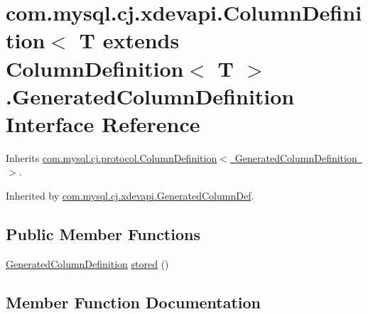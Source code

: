 \hypertarget{interfacecom_1_1mysql_1_1cj_1_1xdevapi_1_1_column_definition_1_1_generated_column_definition}{}\section{com.\+mysql.\+cj.\+xdevapi.\+Column\+Definition$<$ T extends Column\+Definition$<$ T $>$.Generated\+Column\+Definition Interface Reference}
\label{interfacecom_1_1mysql_1_1cj_1_1xdevapi_1_1_column_definition_1_1_generated_column_definition}


Inherits \mbox{\hyperlink{interfacecom_1_1mysql_1_1cj_1_1protocol_1_1_column_definition}{com.\+mysql.\+cj.\+protocol.\+Column\+Definition$<$ Generated\+Column\+Definition $>$}}.



Inherited by \mbox{\hyperlink{classcom_1_1mysql_1_1cj_1_1xdevapi_1_1_generated_column_def}{com.\+mysql.\+cj.\+xdevapi.\+Generated\+Column\+Def}}.

\subsection*{Public Member Functions}
\begin{DoxyCompactItemize}
\item 
\mbox{\hyperlink{interfacecom_1_1mysql_1_1cj_1_1xdevapi_1_1_column_definition_1_1_generated_column_definition}{Generated\+Column\+Definition}} \mbox{\hyperlink{interfacecom_1_1mysql_1_1cj_1_1xdevapi_1_1_column_definition_1_1_generated_column_definition_a47428639edd0873f22e6e540a8a7d7d2}{stored}} ()
\end{DoxyCompactItemize}


\subsection{Member Function Documentation}
\mbox{\label{interfacecom_1_1mysql_1_1cj_1_1xdevapi_1_1_column_definition_1_1_generated_column_definition_a47428639edd0873f22e6e540a8a7d7d2}} 
